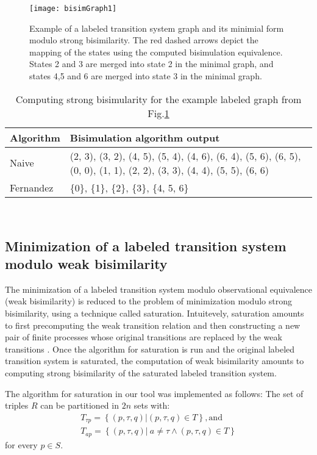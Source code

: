\begin{figure}[h]
	\centering
	\texttt{[image: bisimGraph1]}
	\caption{Example of a labeled transition system graph and its minimial form modulo strong bisimilarity. The red dashed arrows depict the mapping of the states using the computed bisimulation equivalence. States 2 and 3 are merged into state 2 in the minimal graph, and states 4,5 and 6 are merged into state 3 in the minimal graph.}
	\label{fig:bisimGraph1}
\end{figure}

\begin{table}[h]
\begin{tabular}{| l | p{10.5cm}| }
  \hline                       
  Algorithm & Bisimulation algorithm output \\ \hline
  Naive & (2, 3), (3, 2), (4, 5), 
(5, 4), (4, 6), (6, 4), (5, 6), (6, 5), (0, 0), (1, 1), (2, 2), (3, 3), (4, 4), (5, 5), (6, 6) \\ \hline
  Fernandez & \{0\}, \{1\}, \{2\}, \{3\}, \{4, 5, 6\} \\ \hline  
\end{tabular}
\\
\caption{Computing strong bisimularity for the example labeled graph from Fig.\ref{fig:bisimGraph1}}
\label{table1}
\end{table}

\subsection{Minimization of a labeled transition system modulo weak bisimilarity}
The minimization of a labeled transition system modulo observational equivalence (weak bisimilarity) is reduced to the problem of minimization modulo strong bisimilarity, using a technique called saturation. Intuitevely, saturation amounts to first precomputing the weak transition relation and then constructing a new pair of finite processes whose original transitions are replaced by the weak transitions \cite{ReactiveSystems}. Once the algorithm for saturation is run and the original labeled transition system is saturated, the computation of weak bisimilarity amounts to computing strong bisimilarity of the saturated labeled transition system.

The algorithm for saturation in our tool was implemented as follows: The set of triples ${R}$ can be partitioned in ${2n}$ sets with: 
\begin{equation*}
	\begin{array}{lcl}
 		{T_{\tau p}=\left\{\left(p,\tau,q\right)| \left(p,\tau,q\right)\in T\right\}}, \text{and}\\
    {T_{ap}=\left\{\left(p,\tau,q\right)|\ a\neq\tau\wedge\left(p,\tau,q\right)\in T\right\}}
  \end{array}
\end{equation*} 
for every ${p\in S}$.


